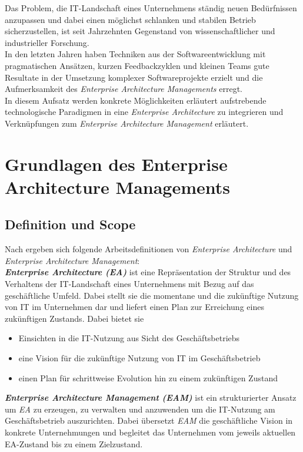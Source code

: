\documentclass{llncs}
\begin{document}
Das Problem, die IT-Landschaft eines Unternehmens ständig neuen Bedürfnissen anzupassen und dabei einen möglichst
schlanken und stabilen Betrieb sicherzustellen, ist seit Jahrzehnten Gegenstand von wissenschaftlicher und industrieller Forschung.\\

In den letzten Jahren haben Techniken aus der Softwareentwicklung mit pragmatischen Ansätzen, kurzen Feedbackzyklen und kleinen Teams gute Resultate in der Umsetzung komplexer Softwareprojekte erzielt und die Aufmerksamkeit des \textit{Enterprise Architecture Managements} erregt\cite{buc:mat}.\\

In diesem Aufsatz werden konkrete Möglichkeiten erläutert aufstrebende technologische Paradigmen in eine \textit{Enterprise Architecture} zu integrieren und Verknüpfungen zum \textit{Enterprise Architecture Management} erläutert.

%
\section{Grundlagen des Enterprise Architecture Managements}
\subsection{Definition und Scope}
Nach \cite{ben} ergeben sich folgende Arbeitsdefinitionen von \textit{Enterprise Architecture} und \textit{Enterprise Architecture Management}:\\

\textbf{\textit{Enterprise Architecture (EA)}} ist eine Repräsentation der Struktur und des Verhaltens der IT-Landschaft eines Unternehmens mit Bezug auf das geschäftliche Umfeld. Dabei stellt sie die momentane und die zukünftige Nutzung von IT im Unternehmen dar und liefert einen Plan zur Erreichung eines zukünftigen Zustands. Dabei bietet sie
%
\begin{itemize}
	\item Einsichten in die IT-Nutzung aus Sicht des Geschäftsbetriebs
	\item eine Vision für die zukünftige Nutzung von IT im Geschäftsbetrieb
	\item einen Plan für schrittweise Evolution hin zu einem zukünftigen Zustand
\end{itemize}

%
\textbf{\textit{Enterprise Architecture Management (EAM)}} ist ein strukturierter Ansatz um \textit{EA} zu erzeugen, zu verwalten und anzuwenden um die IT-Nutzung am Geschäftsbetrieb auszurichten. Dabei übersetzt \textit{EAM} die geschäftliche Vision in konkrete Unternehmungen und begleitet das Unternehmen vom jeweils aktuellen EA-Zustand bis zu einem Zielzustand.
 
\end{document}
